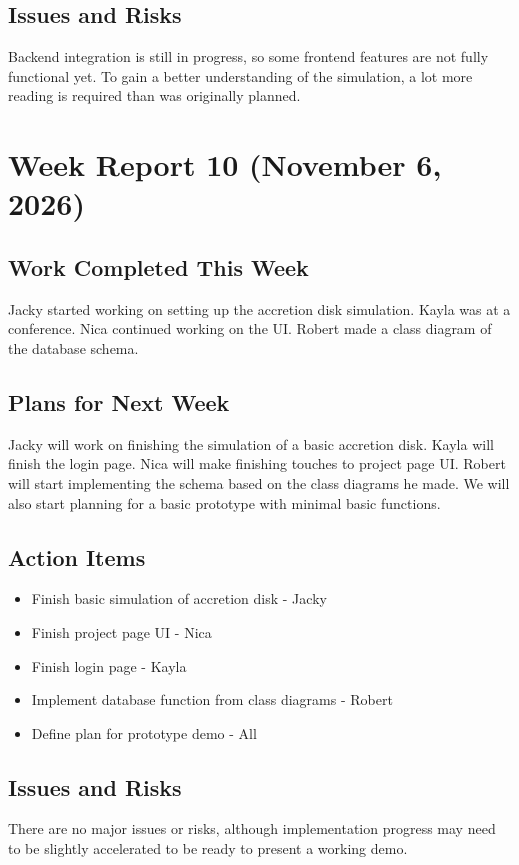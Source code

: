 \subsection{Issues and Risks}
Backend integration is still in progress, so some frontend features are not fully functional yet. To gain a better understanding of the simulation, a lot more reading is required than was originally planned. 

\section{Week Report 10 (November 6, 2026)}
\subsection{Work Completed This Week}
Jacky started working on setting up the accretion disk simulation. Kayla was at a conference. Nica continued working on the UI. Robert made a class diagram of the database schema.
\subsection{Plans for Next Week}
Jacky will work on finishing the simulation of a basic accretion disk. Kayla will finish the login page. Nica will make finishing touches to project page UI. Robert will start implementing the schema based on the class diagrams he made. We will also start planning for a basic prototype with minimal basic functions.
\subsection{Action Items}
\begin{itemize}
    \item Finish basic simulation of accretion disk - Jacky
    \item Finish project page UI - Nica
    \item Finish login page - Kayla
    \item Implement database function from class diagrams - Robert
    \item Define plan for prototype demo - All
\end{itemize}

\subsection{Issues and Risks}
There are no major issues or risks, although implementation progress may need to be slightly accelerated to be ready to present a working demo.

